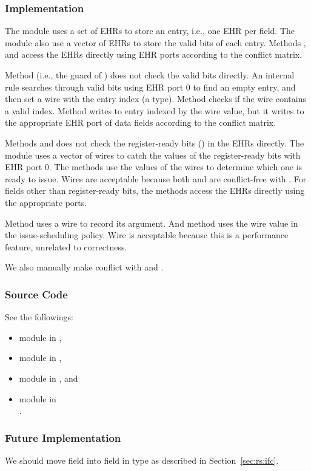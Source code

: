 \subsubsection{Implementation}
The module uses a set of EHRs to store an entry, i.e., one EHR per field.
The module also use a vector of EHRs to store the valid bits of each entry.
Methods ,  and  access the EHRs directly using EHR ports according to the conflict matrix.

Method  (i.e., the guard of ) does not check the valid bits directly.
An internal rule searches through valid bits using EHR port 0 to find an empty entry, and then set a wire with the entry index (a  type).
Method  checks if the wire contains a valid index.
Method  writes to entry indexed by the wire value, but it writes to the appropriate EHR port of data fields according to the conflict matrix.

Methods  and  does not check the register-ready bits () in the EHRs directly.
The module uses a vector of wires to catch the values of the register-ready bits with EHR port 0.
The methods use the values of the wires to determine which one is ready to issue.
Wires are acceptable because both  and  are conflict-free with .
For fields other than register-ready bits, the methods access the EHRs directly using the appropriate ports.

Method  uses a wire to record its argument.
And method  uses the wire value in the issue-scheduling policy.
Wire is acceptable because this is a performance feature, unrelated to correctness.

We also manually make  conflict with  and .

\subsubsection{Source Code}
See the followings:
\begin{itemize}
    \item module  in ,
    \item module  in ,
    \item module  in , and
    \item module  in\\ .
\end{itemize}

\subsubsection{Future Implementation}
We should move field  into field  in type  as described in Section~\ref{sec:rs:ifc}.
